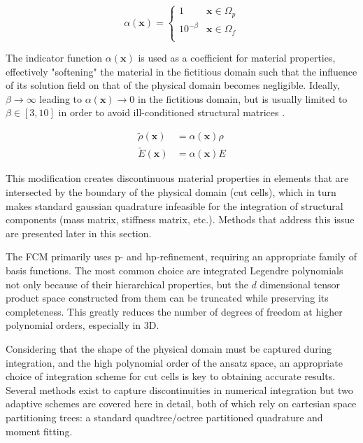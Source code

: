 \begin{equation} \label{eq:indicator_function}
	\alpha (\mathbf x) = \left\{
	\begin{array}{ll}
		1 & \mathbf x \in \Omega_p \\
		10^{-\beta} & \mathbf x \in \Omega_f \\
	\end{array}
	\right.
\end{equation}

The indicator function $\alpha(\mathbf x)$ is used as a coefficient for material properties, effectively "softening" the material in the fictitious domain such that the influence of its solution field on that of the physical domain becomes negligible.
Ideally, $\beta \to \infty$ leading to $\alpha (\mathbf x) \to 0$ in the fictitious domain, but is usually limited to $\beta \in [3,10]$ in order to avoid ill-conditioned structural matrices \cite{Parvizian2007}.

\begin{equation} \label{eq:fictitious_material_properties}
	\begin{array}{ll}
	\tilde \rho (\mathbf x) &= \alpha (\mathbf x) \rho \\
	\tilde E(\mathbf x) &= \alpha (\mathbf x) E
	\end{array}
\end{equation}

This modification creates discontinuous material properties in
elements that are intersected by the boundary of the physical domain (cut cells), which
in turn makes standard gaussian quadrature infeasible for the integration
of structural components (mass matrix, stiffness matrix, etc.). Methods that address this issue are presented later in this section.

The FCM primarily uses p- and hp-refinement, requiring an appropriate family of basis functions. The most common choice are integrated Legendre polynomials \cite{Duester2007} not only because of their hierarchical properties, but the $d$ dimensional tensor product space constructed from them can be truncated while preserving its completeness. This greatly reduces the number of degrees of freedom at higher polynomial orders, especially in 3D.

Considering that the shape of the physical domain must be captured during integration, and the high polynomial order of the ansatz space, an appropriate choice of integration scheme for cut cells is key to obtaining accurate results. Several methods exist
to capture discontinuities in numerical integration but two adaptive schemes are covered here in detail,
both of which rely on cartesian space partitioning trees: a standard quadtree/octree partitioned
quadrature and moment fitting.

